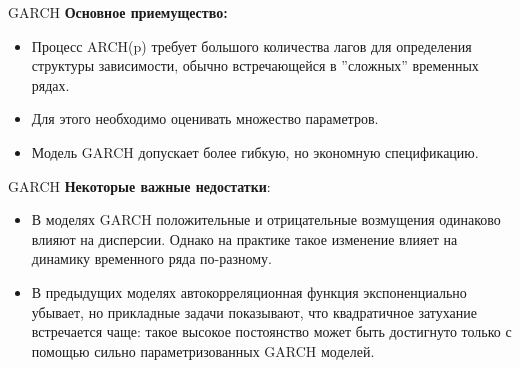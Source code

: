 \begin{frame}{GARCH}
\textbf{Основное приемущество:}
\begin{itemize}
\item Процесс ARCH(p) требует большого количества лагов для определения структуры зависимости, обычно встречающейся в ''сложных'' временных рядах.
\item Для этого необходимо оценивать множество параметров.
\item Модель GARCH допускает более гибкую, но экономную спецификацию.
\end{itemize}
\end{frame}
\begin{frame}{GARCH}
\textbf{Некоторые важные недостатки}:
\begin{itemize}
    \item В моделях GARCH положительные и отрицательные возмущения одинаково влияют на дисперсии. Однако на практике такое изменение влияет на динамику временного ряда по-разному.
    \item В предыдущих моделях автокорреляционная функция экспоненциально убывает, но прикладные задачи показывают, что квадратичное затухание встречается чаще: такое высокое постоянство может быть достигнуто только с помощью сильно параметризованных GARCH моделей.
\end{itemize}

\end{frame}


